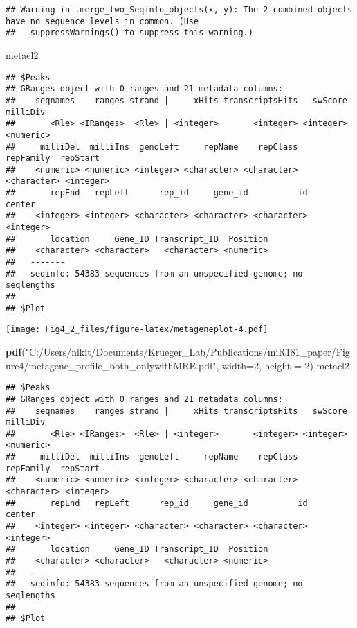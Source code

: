 \documentclass[
]{article}
\newenvironment{Shaded}{\begin{snugshade}}{\end{snugshade}}
\newcommand{\AttributeTok}[1]{\textcolor[rgb]{0.13,0.29,0.53}{#1}}
\newcommand{\DecValTok}[1]{\textcolor[rgb]{0.00,0.00,0.81}{#1}}
\newcommand{\FunctionTok}[1]{\textcolor[rgb]{0.13,0.29,0.53}{\textbf{#1}}}
\newcommand{\NormalTok}[1]{#1}
\newcommand{\StringTok}[1]{\textcolor[rgb]{0.31,0.60,0.02}{#1}}
\begin{document}
\begin{verbatim}
## Warning in .merge_two_Seqinfo_objects(x, y): The 2 combined objects have no sequence levels in common. (Use
##   suppressWarnings() to suppress this warning.)
\end{verbatim}

\begin{Shaded}
\begin{Highlighting}[]
\NormalTok{metael2}
\end{Highlighting}
\end{Shaded}

\begin{verbatim}
## $Peaks
## GRanges object with 0 ranges and 21 metadata columns:
##    seqnames    ranges strand |     xHits transcriptsHits   swScore  milliDiv
##       <Rle> <IRanges>  <Rle> | <integer>       <integer> <integer> <numeric>
##     milliDel  milliIns  genoLeft     repName    repClass   repFamily  repStart
##    <numeric> <numeric> <integer> <character> <character> <character> <integer>
##       repEnd   repLeft      rep_id     gene_id          id    center
##    <integer> <integer> <character> <character> <character> <integer>
##       location     Gene_ID Transcript_ID  Position
##    <character> <character>   <character> <numeric>
##   -------
##   seqinfo: 54383 sequences from an unspecified genome; no seqlengths
## 
## $Plot
\end{verbatim}

\texttt{[image: Fig4\_2\_files/figure-latex/metageneplot-4.pdf]}

\begin{Shaded}
\begin{Highlighting}[]
\FunctionTok{pdf}\NormalTok{(}\StringTok{"C:/Users/nikit/Documents/Krueger\_Lab/Publications/miR181\_paper/Figure4/metagene\_profile\_both\_onlywithMRE.pdf"}\NormalTok{, }\AttributeTok{width=}\DecValTok{2}\NormalTok{, }\AttributeTok{height =} \DecValTok{2}\NormalTok{)}
\NormalTok{metael2}
\end{Highlighting}
\end{Shaded}

\begin{verbatim}
## $Peaks
## GRanges object with 0 ranges and 21 metadata columns:
##    seqnames    ranges strand |     xHits transcriptsHits   swScore  milliDiv
##       <Rle> <IRanges>  <Rle> | <integer>       <integer> <integer> <numeric>
##     milliDel  milliIns  genoLeft     repName    repClass   repFamily  repStart
##    <numeric> <numeric> <integer> <character> <character> <character> <integer>
##       repEnd   repLeft      rep_id     gene_id          id    center
##    <integer> <integer> <character> <character> <character> <integer>
##       location     Gene_ID Transcript_ID  Position
##    <character> <character>   <character> <numeric>
##   -------
##   seqinfo: 54383 sequences from an unspecified genome; no seqlengths
## 
## $Plot
\end{verbatim}
\end{document}
